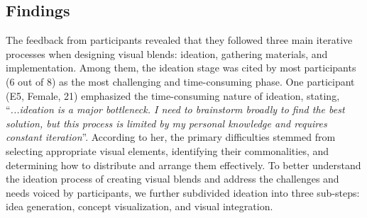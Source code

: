
\subsection{Findings}

The feedback from participants revealed that they followed three main iterative processes when designing visual blends: ideation, gathering materials, and implementation. Among them, the ideation stage was cited by most participants (6 out of 8) as the most challenging and time-consuming phase. 
One participant (E5, Female, 21) emphasized the time-consuming nature of ideation, stating, ``\textit{...ideation is a major bottleneck. I need to brainstorm broadly to find the best solution, but this process is limited by my personal knowledge and requires constant iteration}''. 
According to her, the primary difficulties stemmed from selecting appropriate visual elements, identifying their commonalities, and determining how to distribute and arrange them effectively.
To better understand the ideation process of creating visual blends and address the challenges and needs voiced by participants, we further subdivided ideation into three sub-steps: idea generation, concept visualization, and visual integration.

